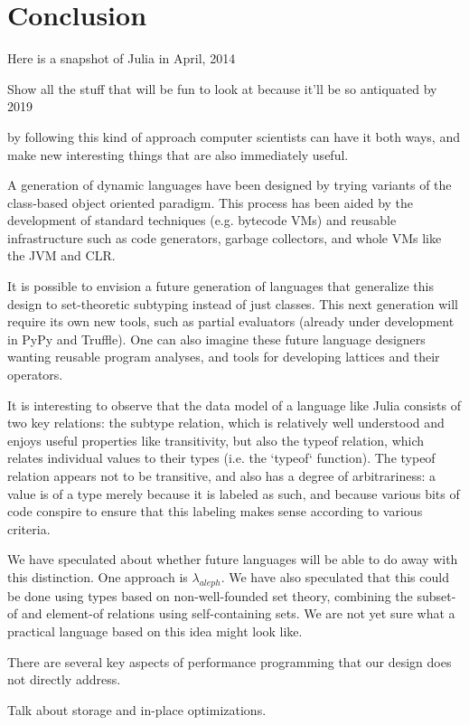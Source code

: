 \chapter{Conclusion}


Here is a snapshot of Julia in April, 2014

Show all the stuff that will be fun to look at because it\textquoteright{}ll
be so antiquated by 2019


by following this kind of approach computer scientists can have it
both ways, and make new interesting things that are also immediately
useful.


A generation of dynamic languages have been designed by trying variants of
the class-based object oriented paradigm. This process has been aided by
the development of standard techniques (e.g. bytecode VMs) and reusable
infrastructure such as code generators, garbage collectors, and whole VMs
like the JVM and CLR.

It is possible to envision a future generation of languages that generalize
this design to set-theoretic subtyping instead of just classes. This next
generation will require its own new tools, such as partial evaluators (already
under development in PyPy and Truffle). One can also imagine these future
language designers wanting reusable program analyses, and tools for
developing lattices and their operators.



It is interesting to observe that the data model of a language like Julia
consists of two key relations: the subtype relation, which is relatively
well understood and enjoys useful properties like transitivity, but also
the typeof relation, which relates individual values to their types
(i.e. the `typeof` function). The typeof relation appears not to be
transitive, and also has a degree of arbitrariness: a value is of a type
merely because it is labeled as such, and because various bits of code
conspire to ensure that this labeling makes sense according to various
criteria.

We have speculated about whether future languages will be able to do away
with this distinction. One approach is $\lambda_{aleph}$. We have also
speculated that this could be done using types based on non-well-founded
set theory, combining the subset-of and element-of relations using
self-containing sets. We are not yet sure what a practical language based
on this idea might look like.


There are several key aspects of performance programming that our design
does not directly address. 

Talk about storage and in-place optimizations.
